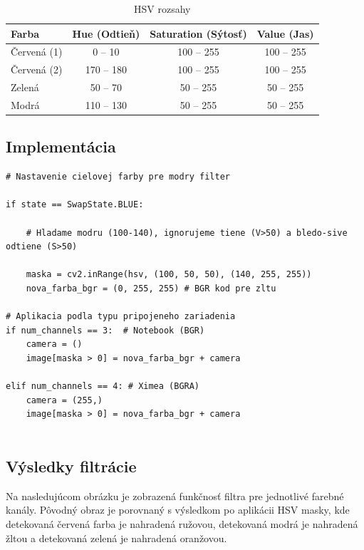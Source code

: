 \documentclass[a4paper, 12pt]{article}
\begin{document}
\begin{table}[h]
\centering
\begin{tabular}{|l|c|c|c|}
\hline
\textbf{Farba} & \textbf{Hue (Odtieň)} & \textbf{Saturation (Sýtosť)} & \textbf{Value (Jas)} \\ \hline
Červená (1)    & 0 -- 10               & 100 -- 255                  & 100 -- 255          \\ \hline
Červená (2)    & 170 -- 180            & 100 -- 255                  & 100 -- 255          \\ \hline
Zelená         & 50 -- 70              & 50 -- 255                   & 50 -- 255           \\ \hline
Modrá          & 110 -- 130            & 50 -- 255                   & 50 -- 255           \\ \hline
\end{tabular}

\caption{HSV rozsahy}
\end{table}
\newpage
\subsection{Implementácia}

\begin{lstlisting}[caption={Implementácia farebného filtra pre 3 a 4-kanálové kamery}]
# Nastavenie cielovej farby pre modry filter

if state == SwapState.BLUE:

    # Hladame modru (100-140), ignorujeme tiene (V>50) a bledo-sive odtiene (S>50)

    maska = cv2.inRange(hsv, (100, 50, 50), (140, 255, 255))
    nova_farba_bgr = (0, 255, 255) # BGR kod pre zltu

# Aplikacia podla typu pripojeneho zariadenia
if num_channels == 3:  # Notebook (BGR)
    camera = ()
    image[maska > 0] = nova_farba_bgr + camera

elif num_channels == 4: # Ximea (BGRA)
    camera = (255,)
    image[maska > 0] = nova_farba_bgr + camera


\end{lstlisting}
\subsection{Výsledky filtrácie}
Na nasledujúcom obrázku je zobrazená funkčnosť filtra pre jednotlivé farebné kanály. Pôvodný obraz je porovnaný s výsledkom po aplikácii HSV masky, kde detekovaná červená farba je nahradená ružovou, detekovaná modrá je nahradená žltou a detekovaná zelená je nahradená oranžovou.
\end{document}
